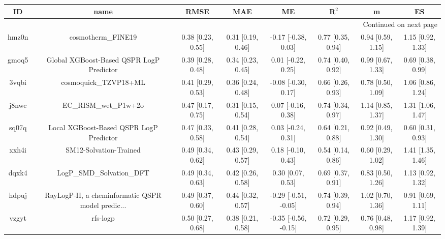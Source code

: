 \documentclass{article}
\begin{document}
\begin{center}
\begin{longtable}{|cccccccc|}
\toprule
    ID &                                               name &               RMSE &                MAE &                    ME &              R$^2$ &                    m &                    ES \\
\midrule
\endhead
\midrule
\multicolumn{8}{r}{{Continued on next page}} \\
\midrule
\endfoot

\bottomrule
\endlastfoot
 hmz0n &                                 cosmotherm\_FINE19 &  0.38 [0.23, 0.55] &  0.31 [0.19, 0.46] &   -0.17 [-0.38, 0.03] &  0.77 [0.35, 0.94] &    0.94 [0.59, 1.15] &     1.15 [0.92, 1.33] \\
 gmoq5 &           Global XGBoost-Based QSPR LogP Predictor &  0.39 [0.28, 0.48] &  0.34 [0.23, 0.45] &    0.01 [-0.22, 0.25] &  0.74 [0.40, 0.92] &    0.99 [0.67, 1.33] &     0.69 [0.38, 0.99] \\
 3vqbi &                              cosmoquick\_TZVP18+ML &  0.41 [0.29, 0.53] &  0.36 [0.24, 0.48] &   -0.08 [-0.30, 0.17] &  0.66 [0.26, 0.93] &    0.78 [0.50, 1.09] &     1.06 [0.86, 1.24] \\
 j8nwc &                              EC\_RISM\_wet\_P1w+2o &  0.47 [0.17, 0.75] &  0.31 [0.15, 0.54] &    0.07 [-0.16, 0.38] &  0.74 [0.34, 0.97] &    1.14 [0.85, 1.37] &     1.31 [1.06, 1.47] \\
 sq07q &            Local XGBoost-Based QSPR LogP Predictor &  0.47 [0.33, 0.58] &  0.41 [0.28, 0.54] &    0.03 [-0.24, 0.31] &  0.64 [0.21, 0.88] &    0.92 [0.49, 1.30] &     0.60 [0.31, 0.93] \\
 xxh4i &                             SM12-Solvation-Trained &  0.49 [0.34, 0.62] &  0.43 [0.29, 0.57] &    0.18 [-0.10, 0.43] &  0.54 [0.14, 0.86] &    0.60 [0.29, 1.02] &     1.41 [1.35, 1.46] \\
 dqxk4 &                          LogP\_SMD\_Solvation\_DFT &  0.49 [0.34, 0.63] &  0.42 [0.26, 0.58] &     0.30 [0.07, 0.53] &  0.69 [0.37, 0.91] &    0.83 [0.50, 1.26] &     1.13 [0.92, 1.32] \\
 hdpuj &  RayLogP-II, a cheminformatic QSPR model predic... &  0.49 [0.37, 0.60] &  0.44 [0.32, 0.57] &  -0.29 [-0.51, -0.05] &  0.74 [0.39, 0.94] &    1.02 [0.70, 1.36] &     0.91 [0.69, 1.11] \\
 vzgyt &                                           rfs-logp &  0.50 [0.27, 0.68] &  0.38 [0.21, 0.58] &  -0.35 [-0.56, -0.15] &  0.72 [0.29, 0.95] &    0.76 [0.48, 0.98] &     1.17 [0.92, 1.39] \\

\end{longtable}
\end{center}
\end{document}
